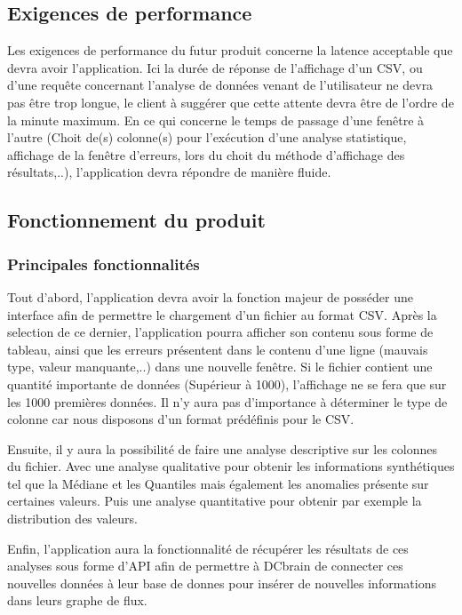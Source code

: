		\subsection{Exigences de performance} 

		Les exigences de performance du futur produit concerne la latence acceptable que devra avoir l'application. Ici la durée de réponse de l’affichage d’un CSV, ou d’une requête concernant l’analyse de données venant de l’utilisateur ne devra pas être trop longue, le client à suggérer que cette attente devra être de l’ordre de la minute maximum. En ce qui concerne le temps de passage d'une fenêtre à l'autre (Choit de(s) colonne(s) pour l'exécution d'une analyse statistique, affichage de la fenêtre d'erreurs, lors du choit du méthode d’affichage des résultats,..), l’application devra répondre de manière fluide. 

		\subsection{Fonctionnement du produit}
			\subsubsection{Principales fonctionnalités}
			Tout d’abord, l’application devra avoir la fonction majeur de posséder une interface afin de permettre le chargement d’un fichier au format CSV. Après la selection de ce dernier, l’application pourra afficher son contenu sous forme de tableau, ainsi que les erreurs présentent dans le contenu d'une ligne (mauvais type, valeur manquante,..) dans une nouvelle fenêtre. Si le fichier contient une quantité importante de données (Supérieur à 1000), l’affichage ne se fera que sur les 1000 premières données.
			Il n’y aura pas d’importance à déterminer le type de colonne car nous disposons d'un format prédéfinis pour le CSV.\newline

			Ensuite, il y aura la possibilité de faire une analyse descriptive sur les colonnes du fichier. Avec une analyse qualitative pour obtenir les informations synthétiques tel que la Médiane et les Quantiles mais également les anomalies présente sur certaines valeurs. Puis une analyse quantitative pour obtenir par exemple la distribution des valeurs.\newline

			Enfin, l’application aura la fonctionnalité de récupérer les résultats de ces analyses sous forme d’API afin de permettre à DCbrain de connecter ces nouvelles données à leur base de donnes pour insérer de nouvelles informations dans leurs graphe de flux.

